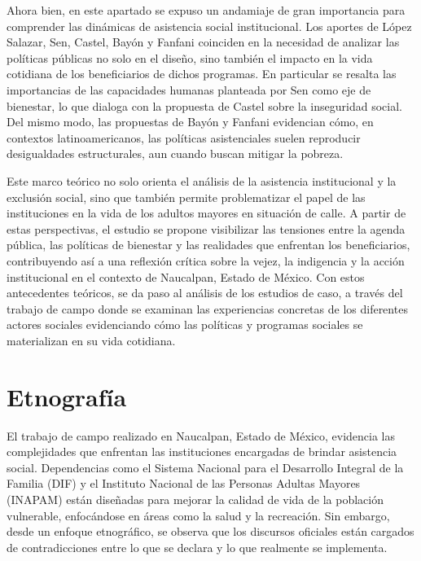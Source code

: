 \documentclass[
  spanish,
  11pt,
  a4paper,
]{scrbook}
\begin{document}
Ahora bien, en este apartado se expuso un andamiaje de gran importancia
para comprender las dinámicas de asistencia social institucional. Los
aportes de López Salazar, Sen, Castel, Bayón y Fanfani coinciden en la
necesidad de analizar las políticas públicas no solo en el diseño, sino
también el impacto en la vida cotidiana de los beneficiarios de dichos
programas. En particular se resalta las importancias de las capacidades
humanas planteada por Sen como eje de bienestar, lo que dialoga con la
propuesta de Castel sobre la inseguridad social. Del mismo modo, las
propuestas de Bayón y Fanfani evidencian cómo, en contextos
latinoamericanos, las políticas asistenciales suelen reproducir
desigualdades estructurales, aun cuando buscan mitigar la pobreza.

Este marco teórico no solo orienta el análisis de la asistencia
institucional y la exclusión social, sino que también permite
problematizar el papel de las instituciones en la vida de los adultos
mayores en situación de calle. A partir de estas perspectivas, el
estudio se propone visibilizar las tensiones entre la agenda pública,
las políticas de bienestar y las realidades que enfrentan los
beneficiarios, contribuyendo así a una reflexión crítica sobre la vejez,
la indigencia y la acción institucional en el contexto de Naucalpan,
Estado de México. Con estos antecedentes teóricos, se da paso al
análisis de los estudios de caso, a través del trabajo de campo donde se
examinan las experiencias concretas de los diferentes actores sociales
evidenciando cómo las políticas y programas sociales se materializan en
su vida cotidiana.

\section*{Etnografía}\label{etnografuxeda}


El trabajo de campo realizado en Naucalpan, Estado de México, evidencia
las complejidades que enfrentan las instituciones encargadas de brindar
asistencia social. Dependencias como el Sistema Nacional para el
Desarrollo Integral de la Familia (DIF) y el Instituto Nacional de las
Personas Adultas Mayores (INAPAM) están diseñadas para mejorar la
calidad de vida de la población vulnerable, enfocándose en áreas como la
salud y la recreación. Sin embargo, desde un enfoque etnográfico, se
observa que los discursos oficiales están cargados de contradicciones
entre lo que se declara y lo que realmente se implementa.
\end{document}
